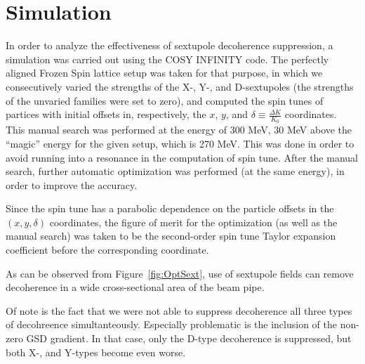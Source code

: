 \documentclass{article}
\begin{document}
\section{Simulation}
In order to analyze the effectiveness of sextupole decoherence suppression, a simulation was carried out using the COSY INFINITY code. The perfectly aligned Frozen Spin lattice setup was taken for that purpose, in which we consecutively varied the strengths of the X-, Y-, and D-sextupoles (the strengths of the unvaried families were set to zero), and computed the spin tunes of partices with initial offsets in, respectively, the $x$, $y$, and $\delta \equiv \frac{\Delta K}{K_0}$ coordinates.~\cite{COSYInf:BPManual} This manual search was performed at the energy of 300 MeV, 30 MeV above the ``magic'' energy for the given setup, which is 270 MeV. This was done in order to avoid running into a resonance in the computation of spin tune. After the manual search, further automatic optimization was performed (at the same energy), in order to improve the accuracy.

Since the spin tune has a parabolic dependence on the particle offsets in the $(x,y,\delta)$ coordinates, the figure of merit for the optimization (as well as the manual search) was taken to be the second-order spin tune Taylor expansion coefficient before the corresponding coordinate.

As can be observed from Figure~\ref{fig:OptSext}, use of sextupole fields can remove decoherence in a wide cross-sectional area of the beam pipe.

Of note is the fact that we were not able to suppress decoherence all three types of decohreence simultanteously. Especially problematic is the inclusion of the non-zero GSD gradient. In that case, only the D-type decoherence is suppressed, but both X-, and Y-types become even worse.
\end{document}
